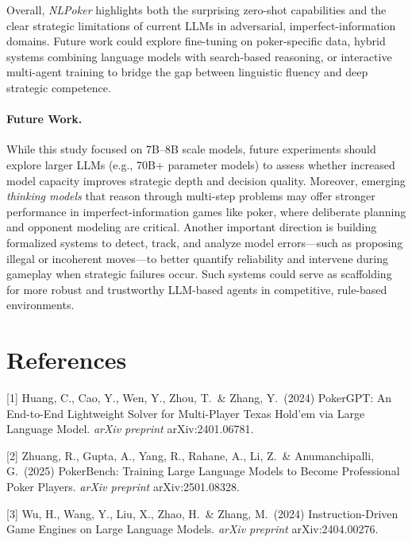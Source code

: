 \documentclass{article}
\begin{document}
Overall, \emph{NLPoker} highlights both the surprising zero-shot capabilities and the clear strategic limitations of current LLMs in adversarial, imperfect-information domains. Future work could explore fine-tuning on poker-specific data, hybrid systems combining language models with search-based reasoning, or interactive multi-agent training to bridge the gap between linguistic fluency and deep strategic competence.

\paragraph{Future Work.}
While this study focused on 7B--8B scale models, future experiments should explore larger LLMs (e.g., 70B+ parameter models) to assess whether increased model capacity improves strategic depth and decision quality. Moreover, emerging \emph{thinking models} that reason through multi-step problems may offer stronger performance in imperfect-information games like poker, where deliberate planning and opponent modeling are critical. Another important direction is building formalized systems to detect, track, and analyze model errors---such as proposing illegal or incoherent moves---to better quantify reliability and intervene during gameplay when strategic failures occur. Such systems could serve as scaffolding for more robust and trustworthy LLM-based agents in competitive, rule-based environments.


\section*{References}

[1] Huang, C., Cao, Y., Wen, Y., Zhou, T.\ \& Zhang, Y.\ (2024) PokerGPT: An End-to-End Lightweight Solver for Multi-Player Texas Hold’em via Large Language Model. \textit{arXiv preprint} arXiv:2401.06781.

[2] Zhuang, R., Gupta, A., Yang, R., Rahane, A., Li, Z.\ \& Anumanchipalli, G.\ (2025) PokerBench: Training Large Language Models to Become Professional Poker Players. \textit{arXiv preprint} arXiv:2501.08328.

[3] Wu, H., Wang, Y., Liu, X., Zhao, H.\ \& Zhang, M.\ (2024) Instruction-Driven Game Engines on Large Language Models. \textit{arXiv preprint} arXiv:2404.00276.
\end{document}
